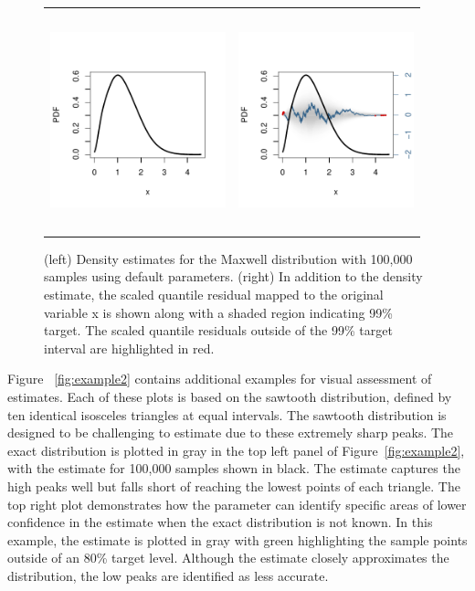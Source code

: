 \begin{figure}[!htb]
\centering
\begin{tabular}{p{} p{}}
  \vspace{0pt} \includegraphics[width=2.0in, height=2.5in]{Figure3a.pdf} &
  \vspace{0pt} \includegraphics[width=2.0in, height=2.5in]{Figure3b.pdf} 
\end{tabular}
\caption{\label{fig:example1} (left) Density estimates for the Maxwell distribution with 100,000 samples using default parameters. (right) In addition to the density estimate, the scaled quantile residual mapped to the original variable x is shown along with a shaded region indicating 99\% target. The scaled quantile residuals outside of the 99\% target interval are highlighted in red.}
\end{figure}

Figure ~\ref{fig:example2} contains additional examples for visual assessment of estimates.  Each of these plots is based on the sawtooth distribution, defined by ten identical isosceles triangles at equal intervals. The sawtooth distribution is designed to be challenging to estimate due to these extremely sharp peaks. The exact distribution is plotted in gray in the top left panel of Figure~\ref{fig:example2}, with the  estimate for 100,000 samples shown in black.  The estimate captures the high peaks well but falls short of reaching the lowest points of each triangle. The top right plot demonstrates how the  parameter can identify specific areas of lower confidence in the estimate when the exact distribution is not known.  In this example, the estimate is plotted in gray with green highlighting the sample points outside of an 80\% target level.  Although the estimate closely approximates the distribution, the low peaks are identified as less accurate.

